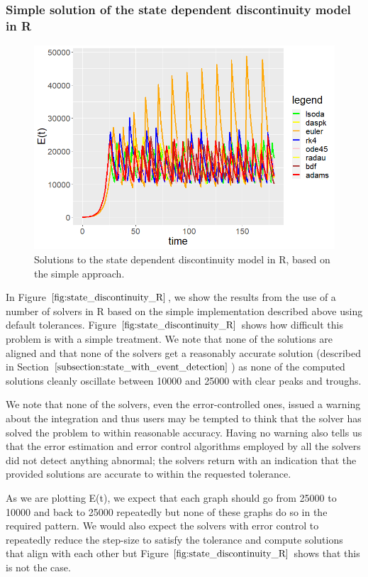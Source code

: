 \subsubsection{Simple solution of the state dependent discontinuity model in R}
\begin{figure}[H]
\centering
\includegraphics[width=0.7\linewidth]{./figures/state_discontinuity_R}
\caption{Solutions to the state dependent discontinuity model in R, based on the simple approach.}
\label{fig:state_discontinuity_R}
\end{figure}
In Figure $\ref{fig:state_discontinuity_R}$, we show the results from the use of a number of solvers in R based on the simple implementation described above using default tolerances. Figure $\ref{fig:state_discontinuity_R}$ shows how difficult this problem is with a simple treatment. We note that none of the solutions are aligned and that none of the solvers get a reasonably accurate solution (described in Section $\ref{subsection:state_with_event_detection}$) as none of the computed solutions cleanly oscillate between 10000 and 25000 with clear peaks and troughs.

We note that none of the solvers, even the error-controlled ones, issued a warning about the integration and thus users may be tempted to think that the solver has solved the problem to within reasonable accuracy. Having no warning also tells us that the error estimation and error control algorithms employed by all the solvers did not detect anything abnormal; the solvers return with an indication that the provided solutions are accurate to within the requested tolerance.

As we are plotting E(t), we expect that each graph should go from 25000 to 10000 and back to 25000 repeatedly but none of these graphs do so in the required pattern. We would also expect the solvers with error control to repeatedly reduce the step-size to satisfy the tolerance and compute solutions that align with each other but Figure $\ref{fig:state_discontinuity_R}$ shows that this is not the case.

